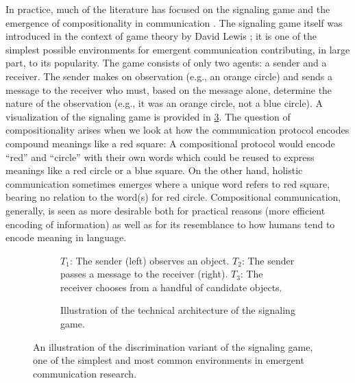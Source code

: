 In practice, much of the literature has focused on the signaling game and the emergence of compositionality in communication
  \citep{havrylov2017sequence,mordatch2018grounded,chaabouni2022emergent}.
The signaling game itself was introduced in the context of game theory by David Lewis \citep{lewis1970ConventionAP};
  it is one of the simplest possible environments for emergent communication contributing, in large part, to its popularity.
The game consists of only two agents: a sender and a receiver.
The sender makes on observation (e.g., an orange circle) and sends a message to the receiver who must, based on the message alone, determine the nature of the observation (e.g., it was an orange circle, not a blue circle).
A visualization of the signaling game is provided in \cref{fig:signaling-game}.
The question of compositionality arises when we look at how the communication protocol encodes compound meanings like a red square: A compositional protocol would encode ``red'' and ``circle'' with their own words which could be reused to express meanings like a red circle or a blue square.
On the other hand, holistic communication sometimes emerges where a unique word refers to red square, bearing no relation to the word(s) for red circle.
Compositional communication, generally, is seen as more desirable both for practical reasons (more efficient encoding of information) as well as for its resemblance to how humans tend to encode meaning in language.

\begin{figure}
  \centering
  \begin{subfigure}[b]{0.53\textwidth}
    \centering
    \setlength\fboxsep{0pt}
    
    \vspace{1cm}
    \caption{%
      $T_1$: The sender (left) observes an object.
      $T_2$: The sender passes a message to the receiver (right).
      $T_3$: The receiver chooses from a handful of candidate objects.
    }
    \unskip\label{fig:boxface}
  \end{subfigure}
  \hfill
  \begin{subfigure}[b]{0.45\textwidth}
    \centering
    
    \caption{Illustration of the technical architecture of the signaling game.}
    \unskip\label{fig:signaling-chart}
  \end{subfigure}
  \caption{%
    An illustration of the discrimination variant of the signaling game, one of the simplest and most common environments in emergent communication research.
  }
  \unskip\label{fig:signaling-game}
\end{figure}


